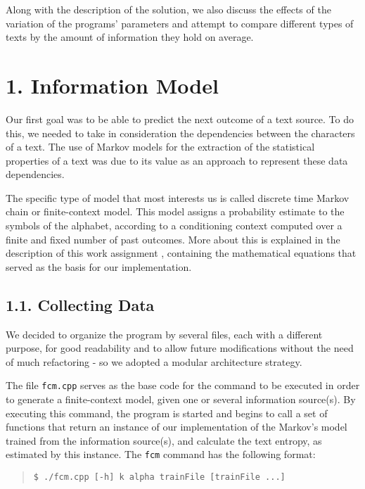 \documentclass[12pt]{article}
\begin{document}
Along with the description of the solution, we also discuss the effects
of the variation of the programs' parameters and attempt to compare 
different types of texts by the amount of information they hold on average.
\newpage

\section*{1. Information Model}

Our first goal was to be able to predict the next outcome of a text source.
To do this, we needed to take in consideration the dependencies between 
the characters of a text.
The use of Markov models for the extraction of the statistical properties of a
text was due to its value as an approach to represent these data dependencies.

The specific type of model that most interests us is called discrete time
Markov chain or finite-context model.
This model assigns a probability estimate to the symbols of the alphabet, 
according to a conditioning context computed over a finite and fixed number
of past outcomes. 
More about this is explained in the description of this work assignment 
\cite{trab1}, containing the mathematical equations that served as the basis 
for our implementation.

\subsection*{1.1. Collecting Data}

We decided to organize the program by several files, each with a different
purpose, for good readability and to allow future modifications without the 
need of much refactoring - so we adopted a modular architecture strategy.

The file \texttt{fcm.cpp} serves as the base code for the command to be executed in order to 
generate a finite-context model, given one or several information source(s).
By executing this command, the program is started and begins to
call a set of functions that return an instance of our 
implementation of the Markov's model trained from the information source(s), 
and calculate the text entropy, as estimated by this instance.
The \texttt{fcm} command has the following format:

\begin{quote}
\begin{verbatim}
$ ./fcm.cpp [-h] k alpha trainFile [trainFile ...]
\end{verbatim}
\end{quote}
\end{document}
